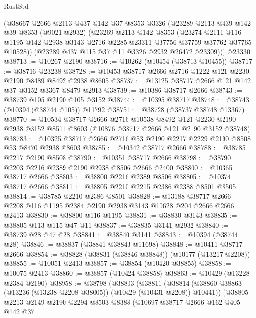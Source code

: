 \begin{lexlean}{RustStd}
\begin{coremodule}
    (@38667
      @2666
      @2113
      @437
      @142
      @37
      @8353
      @3326
      (@23289
        @2113
        @439
        @142
        @39
        @8353
        (@9021 @2932)
        (@23269
          @2113
          @142
          @8353
          (@23274
            @2111
            @116
            @1195
            @142
            @2938
            @3143
            @2716
            @2285
            @23311
            @37756
            @37759
            @37762
            @37765
            @10528))
        (@23289 @437 @115 @37 @11 @3326 @2932 @26472 @23309)))
    @23330
@38713 := @10267 @2190
@38716 := @10262 (@10454 (@38713 @10455))
@38717 := @38716 @23238
@38728 := @10453 @38717 @2666 @2716 @1222 @121 @2230 @2190 @8489 @8492 @2938 @8605
@38737 := @13125 @38717 @2666 @121 @142 @37 @3152 @3367 @8479 @2913
@38739 := @10386 @38717 @2666
@38743 := @38739 @105 @2190 @105 @3152
@38744 := @10395 @38717
@38748 := @38743 (@10394 (@38744 @105)) @11792
@38751 := @38728 (@38737 @38748 @13367)
@38770 := @10534
    @38717
    @2666
    @2716
    @10538
    @8492
    @121
    @2230
    @2190
    @2938
    @3152
    @8511
    @8603
    (@10876 @38717 @2666 @121 @2190 @3152 @38748)
@38783 := @10325 @38717 @2666 @2716 @53 @2190 @2217 @2229 @2190 @8508 @53 @8470 @2938 @8603
@38785 := @10342 @38717 @2666
@38788 := @38785 @2217 @2190 @8508
@38790 := @10351 @38717 @2666
@38798 := @38790 @2203 @2216 @2389 @2190 @2938 @8506 @2666 @2400
@38800 := @10365 @38717 @2666
@38803 := @38800 @2216 @2389 @8506
@38805 := @10374 @38717 @2666
@38811 := @38805 @2210 @2215 @2386 @2388 @8501 @8505
@38814 := @38785 @2210 @2386 @8501
@38828 := @13188 @38717 @2666 @2208 @116 @1195 @2384 @2190 @2938 @3143 @10628 @204 @2666 @2666 @2413
@38830 := @38800 @116 @1195
@38831 := @38830 @3143
@38835 := @38805 @113 @115 @47 @11
@38837 := @38835 @3141 @2932
@38840 := @38739 @28 @47 @28
@38841 := @38840 @3141
@38843 := @10394 (@38744 @28)
@38846 := @38837 (@38841 @38843 @11698)
@38848 := @10411 @38717 @2666
@38854 := @38828 (@38831 (@38846 @38848)) (@10177 (@13217 @2208))
@38855 := @10051 @2413
@38857 := @38854 (@10420 @38855)
@38858 := @10075 @2413
@38860 := @38857 (@10424 @38858)
@38863 := @10429 (@13228 @2384 @2190)
@38958 := @38798
    (@38803
      (@38811
        (@38814 (@38860 @38863 (@13236 (@13238 @2208 @38005)) (@10429 (@10431 @2208)) @10441))
        (@38805
          @2213
          @2149
          @2190
          @2294
          @8503
          @8388
          (@10697
            @38717
            @2666
            @162
            @405
            @142
            @37

\end{coremodule}
\end{lexlean}

